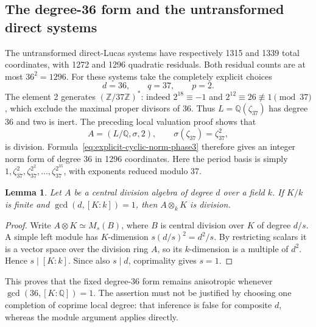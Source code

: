 \documentclass[11pt]{article}
\newtheorem{lemma}[theorem]{Lemma}
\theoremstyle{definition}
\begin{document}
\subsection{The degree-36 form and the untransformed direct systems}

The untransformed direct-Lucas systems have respectively 1315 and 1339
total coordinates, with 1272 and 1296 quadratic residuals.
Both residual counts are at most $36^2=1296$.  For these systems
take the completely explicit choices
\[
                    d=36,\qquad q=37,\qquad p=2.
\]
The element 2 generates $(\mathbb Z/37\mathbb Z)^*$: indeed
$2^{18}\equiv-1$ and $2^{12}\equiv26\not\equiv1\pmod{37}$,
which exclude the maximal proper divisors of 36.
Thus $L=\mathbb Q(\zeta_{37})$ has degree 36 and two is inert.
The preceding local valuation proof shows that
\[
                    A=(L/\mathbb Q,\sigma,2),
             \qquad \sigma(\zeta_{37})=\zeta_{37}^2,
\]
is division.  Formula~\eqref{eq:explicit-cyclic-norm-phase3}
therefore gives an integer norm form of degree 36 in 1296
coordinates.  Here the period basis is simply
$1,\zeta_{37}^{2},\zeta_{37}^{2^2},\ldots,
\zeta_{37}^{2^{35}}$, with exponents reduced modulo 37.

\begin{lemma}\label{lem:division-coprime-base-change-phase3}
Let $A$ be a central division algebra of degree $d$ over a
field $k$.  If $K/k$ is finite and
$\gcd(d,[K:k])=1$, then $A\otimes_k K$ is division.
\end{lemma}
\begin{proof}
Write $A\otimes K\simeq M_s(B)$, where $B$ is central
division over $K$ of degree $d/s$.  A simple left module
has $K$-dimension $s(d/s)^2=d^2/s$.  By restricting scalars
it is a vector space over the division ring $A$, so its
$k$-dimension is a multiple of $d^2$.  Hence
$s\mid[K:k]$.  Since also $s\mid d$, coprimality gives
$s=1$.
\end{proof}

This proves that the fixed degree-36 form remains anisotropic
whenever $\gcd(36,[K:\mathbb Q])=1$.  The assertion must not
be justified by choosing one completion of coprime local degree:
that inference is false for composite $d$, whereas the module
argument applies directly.
\end{document}
